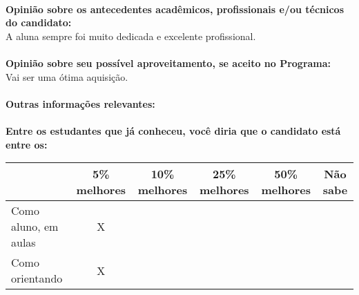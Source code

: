 \documentclass[11pt]{article}
\begin{document}
\\
\textbf{Opinião sobre os antecedentes acadêmicos, profissionais e/ou técnicos do candidato:}
\\A aluna sempre foi muito dedicada e excelente profissional.\\
\\
\textbf{Opinião sobre seu possível aproveitamento, se aceito no Programa:}
\\Vai ser uma ótima aquisição.\\ 
\\
\textbf{Outras informações relevantes:} \\
\\[0.3cm]
\textbf{Entre os estudantes que já conheceu, você diria que o candidato está entre os:}
\\
\begin{tabular}{|l|c|c|c|c|c|}
\hline
 & 5\% melhores & 10\% melhores & 25\% melhores & 50\% melhores & Não sabe \\
\hline
Como aluno, em aulas & X &  &  &  & \\
\hline
Como orientando & X &  &  &  & \\
\hline
\end{tabular}
\end{document}
